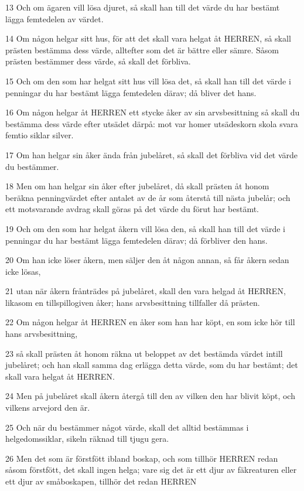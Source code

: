 \par 13 Och om ägaren vill lösa djuret, så skall han till det värde du har bestämt lägga femtedelen av värdet.
\par 14 Om någon helgar sitt hus, för att det skall vara helgat åt HERREN, så skall prästen bestämma dess värde, alltefter som det är bättre eller sämre. Såsom prästen bestämmer dess värde, så skall det förbliva.
\par 15 Och om den som har helgat sitt hus vill lösa det, så skall han till det värde i penningar du har bestämt lägga femtedelen därav; då bliver det hans.
\par 16 Om någon helgar åt HERREN ett stycke åker av sin arvsbesittning så skall du bestämma dess värde efter utsädet därpå: mot var homer utsädeskorn skola svara femtio siklar silver.
\par 17 Om han helgar sin åker ända från jubelåret, så skall det förbliva vid det värde du bestämmer.
\par 18 Men om han helgar sin åker efter jubelåret, då skall prästen åt honom beräkna penningvärdet efter antalet av de år som återstå till nästa jubelår; och ett motsvarande avdrag skall göras på det värde du förut har bestämt.
\par 19 Och om den som har helgat åkern vill lösa den, så skall han till det värde i penningar du har bestämt lägga femtedelen därav; då förbliver den hans.
\par 20 Om han icke löser åkern, men säljer den åt någon annan, så får åkern sedan icke lösas,
\par 21 utan när åkern frånträdes på jubelåret, skall den vara helgad åt HERREN, likasom en tillspillogiven åker; hans arvsbesittning tillfaller då prästen.
\par 22 Om någon helgar åt HERREN en åker som han har köpt, en som icke hör till hans arvsbesittning,
\par 23 så skall prästen åt honom räkna ut beloppet av det bestämda värdet intill jubelåret; och han skall samma dag erlägga detta värde, som du har bestämt; det skall vara helgat åt HERREN.
\par 24 Men på jubelåret skall åkern återgå till den av vilken den har blivit köpt, och vilkens arvejord den är.
\par 25 Och när du bestämmer något värde, skall det alltid bestämmas i helgedomssiklar, sikeln räknad till tjugu gera.
\par 26 Men det som är förstfött ibland boskap, och som tillhör HERREN redan såsom förstfött, det skall ingen helga; vare sig det är ett djur av fäkreaturen eller ett djur av småboskapen, tillhör det redan HERREN
